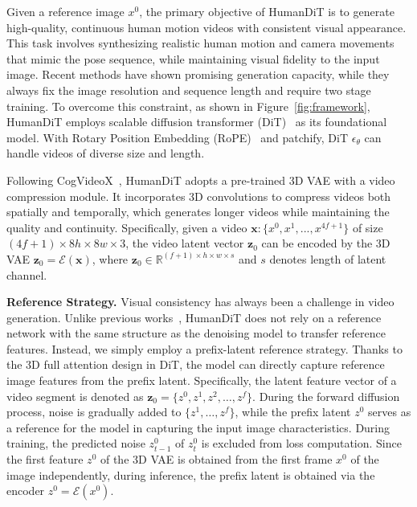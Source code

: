 Given a reference image $x^{0}$, the primary objective of HumanDiT is to generate high-quality, continuous human motion videos with consistent visual appearance. This task involves synthesizing realistic human motion and camera movements that mimic the pose sequence, while maintaining visual fidelity to the input image. Recent methods have shown promising generation capacity, while they always fix the image resolution and sequence length and require two stage training. To overcome this constraint, as shown in Figure~\ref{fig:framework}, HumanDiT employs scalable diffusion transformer (DiT)~\cite{peebles2023scalable} as its foundational model. With Rotary Position Embedding (RoPE)~\cite{su2024roformer} and patchify, DiT $\epsilon_\theta$ can handle videos of diverse size and length.

Following CogVideoX~\cite{yang2024cogvideox}, HumanDiT adopts a pre-trained 3D VAE with a video compression module. It incorporates 3D convolutions to compress videos both spatially and temporally, which generates longer videos while maintaining the quality and continuity. Specifically, given a video $\mathbf{x}:\{x^0,x^1,...,x^{4f+1}\}$ of size $(4f + 1) \times 8h \times 8w \times 3$, the video latent vector $\mathbf{z}_0$ can be encoded by the 3D VAE $\mathbf{z}_0 = \mathcal{E}(\mathbf{x})$, where $\mathbf{z}_0 \in \mathbb{R}^{(f+1) \times h \times w \times s}$ and $s$ denotes length of latent channel.

\noindent\textbf{Reference Strategy.} Visual consistency has always been a challenge in video generation. Unlike previous works~\cite{hu2024animate,zhang2024mimicmotion}, HumanDiT does not rely on a reference network with the same structure as the denoising model to transfer reference features. Instead, we simply employ a prefix-latent reference strategy. Thanks to the 3D full attention design in DiT, the model can directly capture reference image features from the prefix latent. Specifically, the latent feature vector of a video segment is denoted as $ \mathbf{z}_0 = \{z^0, z^1, z^2, \dots, z^f\} $. During the forward diffusion process, noise is gradually added to $ \{z^1, \dots, z^f\} $, while the prefix latent $ z^0 $ serves as a reference for the model in capturing the input image characteristics. During training, the predicted noise $ z_{t-1}^0 $ of $ z_t^0 $ is excluded from loss computation. Since the first feature $z^0$ of the 3D VAE is obtained from the first frame $x^0$ of the image independently, during inference, the prefix latent is obtained via the encoder $ z^0 = \mathcal{E}(x^0) $.

